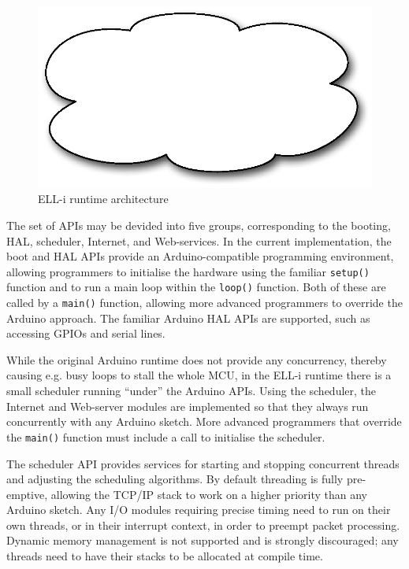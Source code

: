 \documentclass[draft,a4paper]{siamltex}
\begin{document}
\begin{figure}
\centering
\includegraphics[scale=.4]{figure-software.eps}
\caption{ELL-i runtime architecture}
\label{fig:software}
\end{figure}

The set of APIs may be devided into five groups, corresponding to the
booting, HAL, scheduler, Internet, and Web-services.  In the current
implementation, the boot and HAL APIs provide an Arduino-compatible
programming environment, allowing programmers to initialise the
hardware using the familiar \hbox{\tt setup()} function and to run a
main loop within the \hbox{\tt loop()} function.  Both of these are
called by a \hbox{\tt main()} function, allowing more advanced
programmers to override the Arduino approach.  The familiar Arduino
HAL APIs are supported, such as accessing GPIOs and serial lines.

While the original Arduino runtime does not provide any concurrency,
thereby causing e.g. busy loops to stall the whole MCU, in the ELL-i
runtime there is a small scheduler running ``under'' the Arduino
APIs.  Using the scheduler, the Internet and Web-server modules are
implemented so that they always run concurrently with any Arduino
sketch.  More advanced programmers that override the \hbox{\tt main()}
function must include a call to initialise the scheduler.

The scheduler API provides services for starting and stopping concurrent
threads and adjusting the scheduling algorithms.  By default threading
is fully pre-emptive, allowing the TCP/IP stack to work on a higher
priority than any Arduino sketch.  Any I/O modules requiring precise
timing need to run on their own threads, or in their interrupt
context, in order to preempt packet processing.  Dynamic memory
management is not supported and is strongly discouraged; any threads
need to have their stacks to be allocated at compile time.
\end{document}
